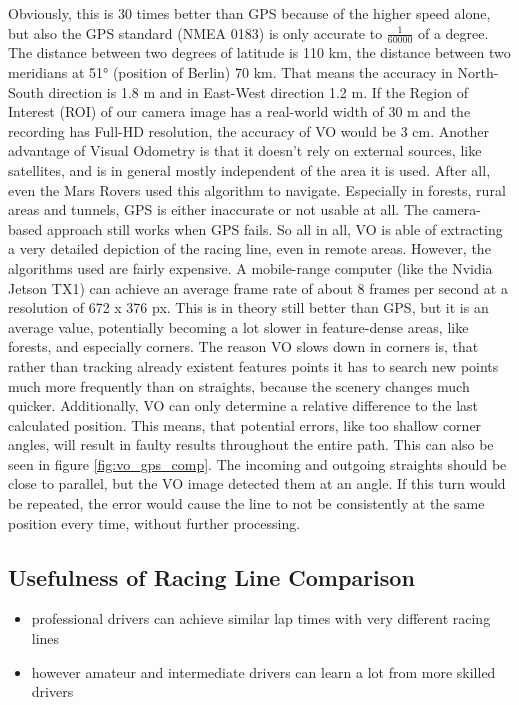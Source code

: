Obviously, this is 30 times better than GPS because of the higher speed alone, but also the GPS standard (NMEA 0183) is only accurate to $\frac{1}{60 000}$ of a degree. The distance between two degrees of latitude is 110 km, the distance between two meridians at 51° (position of Berlin) 70 km. That means the accuracy in North-South direction is 1.8 m and in East-West direction 1.2 m. If the Region of Interest (ROI) of our camera image has a real-world width of 30 m and the recording has Full-HD resolution, the accuracy of VO would be 3 cm.
Another advantage of Visual Odometry is that it doesn't rely on external sources, like satellites, and is in general mostly independent of the area it is used. After all, even the Mars Rovers used this algorithm to navigate. Especially in forests, rural areas and tunnels, GPS is either inaccurate or not usable at all. The camera-based approach still works when GPS fails.
So all in all, VO is able of extracting a very detailed depiction of the racing line, even in remote areas. However, the algorithms used are fairly expensive.
A mobile-range computer (like the Nvidia Jetson TX1) can achieve an average frame rate of about 8 frames per second at a resolution of 672 x 376 px. This is in theory still better than GPS, but it is an average value, potentially becoming a lot slower in feature-dense areas, like forests, and especially corners. The reason VO slows down in corners is, that rather than tracking already existent features points it has to search new points much more frequently than on straights, because the scenery changes much quicker.
Additionally, VO can only determine a relative difference to the last calculated position. This means, that potential errors, like too shallow corner angles, will result in faulty results throughout the entire path. This can also be seen in figure \ref{fig:vo_gps_comp}. The incoming and outgoing straights should be close to parallel, but the VO image detected them at an angle. If this turn would be repeated, the error would cause the line to not be consistently at the same position every time, without further processing.

\subsection{Usefulness of Racing Line Comparison}
\begin{itemize}
  \item professional drivers can achieve similar lap times with very different racing lines
  \item however amateur and intermediate drivers can learn a lot from more skilled drivers
\end{itemize}


\clearpage
